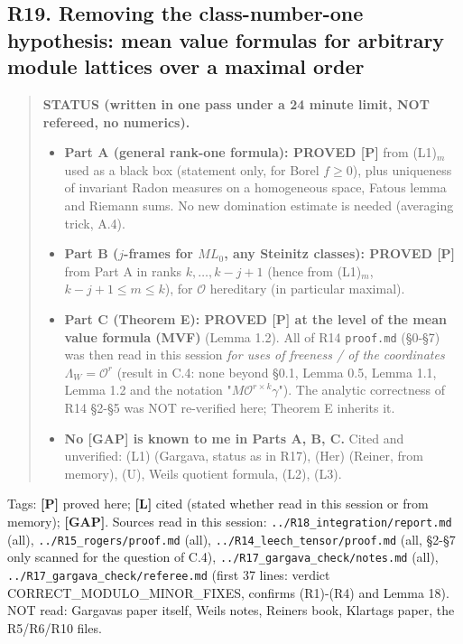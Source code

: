 \hypertarget{r19.-removing-the-class-number-one-hypothesis-mean-value-formulas-for-arbitrary-module-lattices-over-a-maximal-order}{%
\subsection*{R19. Removing the class-number-one hypothesis: mean value formulas for arbitrary module lattices over a maximal order}\label{r19.-removing-the-class-number-one-hypothesis-mean-value-formulas-for-arbitrary-module-lattices-over-a-maximal-order}}

\begin{quote}
\textbf{STATUS (written in one pass under a 24 minute limit, NOT refereed, no numerics).}

\begin{itemize}
\tightlist
\item
  \textbf{Part A (general rank-one formula): PROVED {[}P{]}} from (L1)\(_m\) used as a black box (statement only, for Borel \(f\ge0\)), plus uniqueness of invariant Radon measures on a homogeneous space, Fatou\textquotesingle s lemma and Riemann sums. No new domination estimate is needed (averaging trick, A.4).
\item
  \textbf{Part B (\(j\)-frames for \(M L_0\), any Steinitz classes): PROVED {[}P{]}} from Part A in ranks \(k,\dots,k-j+1\) (hence from (L1)\(_m\), \(k-j+1\le m\le k\)), for \(\mathcal O\) hereditary (in particular maximal).
\item
  \textbf{Part C (Theorem E\textquotesingle): PROVED {[}P{]} at the level of the mean value formula (MVF)} (Lemma 1.2\textquotesingle). All of R14 \texttt{proof.md} (§0-§7) was then read in this session \emph{for uses of freeness / of the coordinates \(\Lambda_W=\mathcal O^r\)} (result in C.4: none beyond §0.1, Lemma 0.5, Lemma 1.1, Lemma 1.2 and the notation "\(M\mathcal O^{r\times k}\gamma\)"). The analytic correctness of R14 §2-§5 was NOT re-verified here; Theorem E\textquotesingle{} inherits it.
\item
  \textbf{No {[}GAP{]} is known to me in Parts A, B, C.} Cited and unverified: (L1) (Gargava, status as in R17), (Her) (Reiner, from memory), (U), Weil\textquotesingle s quotient formula, (L2), (L3).
\end{itemize}
\end{quote}

Tags: \textbf{{[}P{]}} proved here; \textbf{{[}L{]}} cited (stated whether read in this session or from memory); \textbf{{[}GAP{]}}.
Sources read in this session: \texttt{../R18\_integration/report.md} (all), \texttt{../R15\_rogers/proof.md} (all), \texttt{../R14\_leech\_tensor/proof.md} (all, §2-§7 only scanned for the question of C.4), \texttt{../R17\_gargava\_check/notes.md} (all), \texttt{../R17\_gargava\_check/referee.md} (first 37 lines: verdict CORRECT\_MODULO\_MINOR\_FIXES, confirms (R1)-(R4) and Lemma 18). NOT read: Gargava\textquotesingle s paper itself, Weil\textquotesingle s notes, Reiner\textquotesingle s book, Klartag\textquotesingle s paper, the R5/R6/R10 files.

